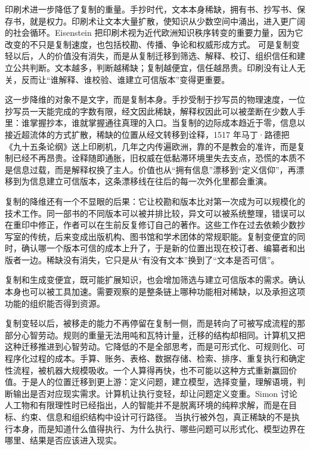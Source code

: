 
印刷术进一步降低了复制的重量。手抄时代，文本本身稀缺，拥有书、抄写书、保存书，就是权力。印刷术让文本大量扩散，使知识从少数空间中涌出，进入更广阔的社会循环。Eisenstein 把印刷术视为近代欧洲知识秩序转变的重要力量，因为它改变的不只是复制速度，也包括校勘、传播、争论和权威形成方式。\cite{eisenstein1979printing} 可是复制变轻以后，人的价值没有消失，而是从复制迁移到筛选、解释、校订、组织信任和建立公共判断。文本越多，判断越稀缺；复制越便宜，信任越昂贵。印刷没有让人无关，反而让“谁解释、谁校验、谁建立可信版本”变得更重要。

这一步降维的对象不是文字，而是复制本身。手抄受制于抄写员的物理速度，一位抄写员一天能完成的字数有限，经文因此稀缺，解释权因此可以被垄断在少数人手里：谁掌握抄本，谁就掌握通往真理的入口。当复制的边际成本趋近于零，信息以接近超流体的方式扩散，稀缺的位置从经文转移到诠释，1517 年马丁·路德把《九十五条论纲》送上印刷机，几年之内传遍欧洲，靠的不是教会的准许，而是复制已经不再昂贵。诠释随即通胀，旧权威在低黏滞环境里失去支点，恐慌的本质不是信息过载，而是解释权换了主人。价值也从“拥有信息”漂移到“定义信仰”，再漂移到为信息建立可信版本，这条漂移线在往后的每一次外化里都会重演。

复制的降维还有一个不显眼的后果：它让校勘和版本比对第一次成为可以规模化的技术工作。同一部书的不同版本可以被并排比较，异文可以被系统整理，错误可以在重印中修正，作者可以在生前反复修订自己的著作。这些工作在过去依赖少数抄写室的传统，后来变成出版机构、图书馆和学术团体的常规职能。复制变便宜的同时，确认哪一个版本可信的成本上升了，于是新的位置出现在校订者、编纂者和出版者一边。稀缺没有消失，它只是从“有没有文本”换到了“文本是否可信”。

复制和生成变便宜，既可能扩展知识，也会增加筛选与建立可信版本的需求。确认本身也可以被工具加速。需要观察的是整条链上哪种功能相对稀缺，以及承担这项功能的组织能否得到资源。


复制变轻以后，被移走的能力不再停留在复制一侧，而是转向了可被写成流程的那部分心智劳动。规则的重量无法用吨和瓦特计量，迁移的结构却相同。计算机又把这种迁移推进到心智劳动。它降低的不是全部思考，而是可形式化、可规则化、可程序化过程的成本。手算、账务、表格、数据存储、检索、排序、重复执行和确定性流程，被机器大规模吸收。一个人算得再快，也不可能以这种方式重新赢回价值。于是人的位置迁移到更上游：定义问题，建立模型，选择变量，理解语境，判断输出是否对应现实需求。计算机让执行变轻，却让问题定义变重。Simon 讨论人工物和有限理性时已经指出，人的智能并不是脱离环境的纯粹求解，而是在目标、约束、信息和组织结构中设计可行路径。\cite{simon1969sciences} 当执行被外包，真正稀缺的不是执行本身，而是知道什么值得执行、为什么执行、哪些问题可以形式化、模型边界在哪里、结果是否应该进入现实。


